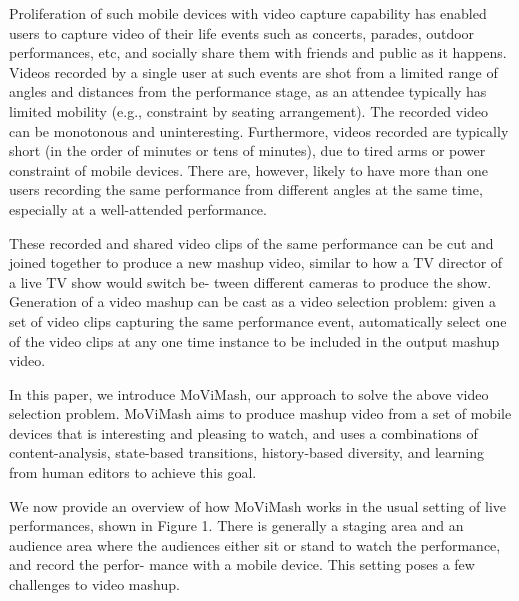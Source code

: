 \documentclass{sig-alternate}
\begin{document}
Proliferation of such mobile devices with video capture capability has enabled users to capture video of their life events such
as concerts, parades, outdoor performances, etc, and socially share
them with friends and public as it happens. Videos recorded by
a single user at such events are shot from a limited range of angles and distances from the performance stage, as an attendee typically has limited mobility (e.g., constraint by seating arrangement).
The recorded video can be monotonous and uninteresting. Furthermore, videos recorded are typically short (in the order of minutes
or tens of minutes), due to tired arms or power constraint of mobile
devices. There are, however, likely to have more than one users
recording the same performance from different angles at the same
time, especially at a well-attended performance.

These recorded and shared video clips of the same performance
can be cut and joined together to produce a new mashup video,
similar to how a TV director of a live TV show would switch be-
tween different cameras to produce the show. Generation of a video
mashup can be cast as a video selection problem: given a set of
video clips capturing the same performance event, automatically
select one of the video clips at any one time instance to be included
in the output mashup video.

In this paper, we introduce MoViMash, our approach to solve
the above video selection problem. MoViMash aims to produce
mashup video from a set of mobile devices that is interesting and
pleasing to watch, and uses a combinations of content-analysis,
state-based transitions, history-based diversity, and learning from
human editors to achieve this goal.

We now provide an overview of how MoViMash works in the
usual setting of live performances, shown in Figure 1. There is
generally a staging area and an audience area where the audiences
either sit or stand to watch the performance, and record the perfor-
mance with a mobile device. This setting poses a few challenges to
video mashup.
\end{document}
